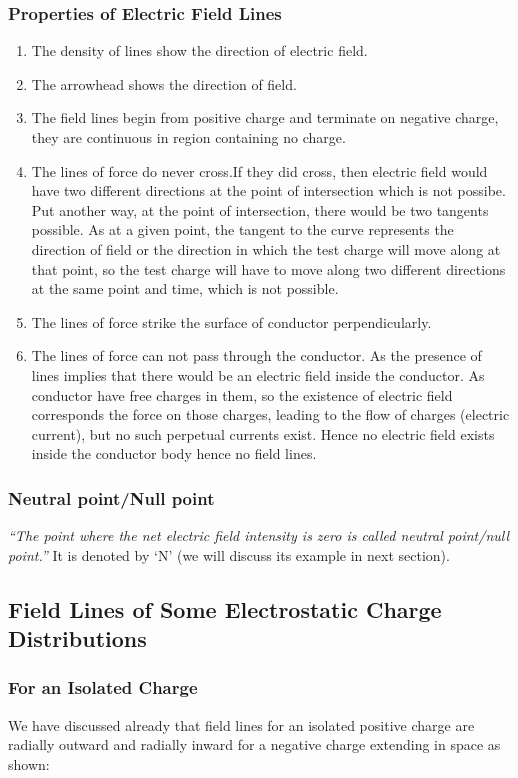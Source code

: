 \subsubsection{Properties of Electric Field Lines}
\begin{enumerate}[label=(\roman*)]
\item The density of lines show the direction of electric field.
\item The arrowhead shows the direction of field.
\item The field lines begin from positive charge and terminate on negative
charge, they are continuous in region containing no charge.
\item The lines of force do never cross.If they did cross,
then electric field would have two different directions at
the point of intersection which is not possibe.
Put another way, at the point of intersection,
there would be two tangents possible. As at a given point,
the tangent to the curve represents the direction of field or
the direction in which the test charge will move along at that point,
so the test charge will have to move along two different directions
at the same point and time, which is not possible.
\item The lines of force strike the surface of conductor perpendicularly.
\item The lines of force can not pass through the conductor. As the 
presence of lines implies that there would be an electric field
inside the conductor. As conductor have free charges in them,
so the existence of electric field corresponds the force on those charges,
leading to the flow of charges (electric current),
but no such perpetual currents exist. Hence no electric field exists
inside the conductor body hence no field lines.
\end{enumerate}
\subsubsection{Neutral point/Null point}
\textit{“The point where the net electric field intensity
is zero is called neutral point/null point.”}
It is denoted by ‘N’ (we will discuss its example in next section).
\subsection{Field Lines of Some Electrostatic Charge Distributions}
\subsubsection{For an Isolated Charge}
We have discussed already that field lines for an isolated positive charge are radially outward and radially 
inward for a negative charge extending in space as shown:

